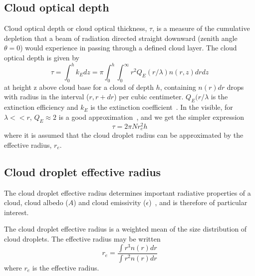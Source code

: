 \subsection{Cloud optical depth}
Cloud optical depth or cloud optical thickness, $\tau$, is a measure of the cumulative depletion that a beam of radiation directed straight downward (zenith angle $\theta = 0$) would experience in passing through a defined cloud layer. The cloud optical depth is given by~\citep{Twomey1977}
\begin{equation}
\tau = \int_0^h k_{E}dz = \pi \int_0^h \int_0^{\infty}r^2Q_E(r/\lambda)n(r,z)drdz
\end{equation}
at height z above cloud base for a cloud of depth $h$, containing $n(r)dr$ drops with radius in the interval ($r, r + dr$) per cubic centimeter. 
$Q_E(r/\lambda$ is the extinction efficiency and $k_{E}$ is the extinction coefficient~\citep{Twomey1977}. In the visible, for $\lambda<<r$, $Q_E\approx 2$ is a good approximation~\citep{Liou2002}, and we get the simpler expression
\begin{equation}
\tau = 2\pi N r_e^2h
\end{equation}
where it is assumed that the cloud droplet radius can be approximated by the effective radius, $r_e$.


\subsection{Cloud droplet effective radius}
The cloud droplet effective radius determines important radiative properties of a cloud, cloud albedo ($A$) and cloud emissivity ($\epsilon$)~\citep{Hansen1974}, and is therefore of particular interest.

The cloud droplet effective radius is a weighted mean of the size distribution of cloud droplets. The effective radius may be written
\begin{equation}
r_e = \frac{\int r^3 n(r) dr}{\int r^2 n(r) dr}
\end{equation}
where $r_e$ is the effective radius.



